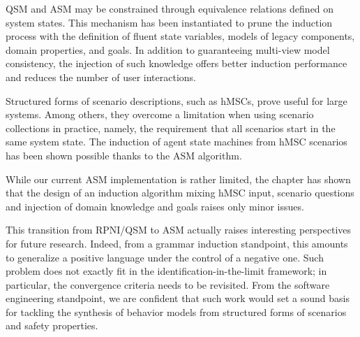 QSM and ASM may be constrained through equivalence relations defined on system states. This mechanism has been instantiated to prune the induction process with the definition of fluent state variables, models of legacy components, domain properties, and goals. In addition to guaranteeing multi-view model consistency, the injection of such knowledge offers better induction performance and reduces the number of user interactions.

Structured forms of scenario descriptions, such as hMSCs, prove useful for large systems. Among others, they overcome a limitation when using scenario collections in practice, namely, the requirement that all scenarios start in the same system state. The induction of agent state machines from hMSC scenarios has been shown possible thanks to the ASM algorithm. 

While our current ASM implementation is rather limited, the chapter has shown that the design of an induction algorithm mixing hMSC input, scenario questions and injection of domain knowledge and goals raises only minor issues. 

This transition from RPNI/QSM to ASM actually raises interesting perspectives for future research. Indeed, from a grammar induction standpoint, this amounts to generalize a positive language under the control of a negative one. Such problem does not exactly fit in the identification-in-the-limit framework; in particular, the convergence criteria needs to be revisited. From the software engineering standpoint, we are confident that such work would set a sound basis for tackling the synthesis of behavior models from structured forms of scenarios and safety properties.
